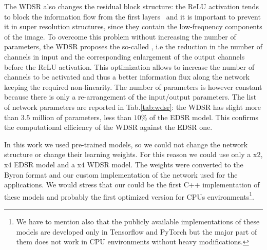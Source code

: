 \documentclass{standalone}
\begin{document}
The WDSR also changes the residual block structure: the ReLU activation tends to block the information flow from the first layers~\cite{mobilenet} and it is important to prevent it in super resolution structures, since they contain the low-frequency components of the image.
To overcome this problem without increasing the number of parameters, the WDSR proposes the so-called , i.e the reduction in the number of channels in input and the corresponding enlargement of the output channels before the ReLU activation.
This optimization allows to increase the number of channels to be activated and thus a better information flux along the network keeping the required non-linearity.
The number of parameters is however constant because there is only a re-arrangement of the input/output parameters.
The list of network parameters are reported in Tab.\ref{tab:wdsr}: the WDSR has slight more than $3.5$ million of parameters, less than $10$\% of the EDSR model.
This confirms the computational efficiency of the WDSR against the EDSR one.

In this work we used pre-trained models, so we could not change the network structure or change their learning weights.
For this reason we could use only a x$2$, x$4$ EDSR model and a x$4$ WDSR model.
The weights were converted to the \textsf{Byron} format and our custom implementation of the network used for the applications.
We would stress that our could be the first \textsf{C++} implementation of these models and probably the first optimized version for CPUs environments\footnote{
  We have to mention also that the publicly available implementations of these models are developed only in \textsf{Tensorflow} and \textsf{PyTorch} but the major part of them does not work in CPU environments without heavy modifications.
}.
\end{document}
